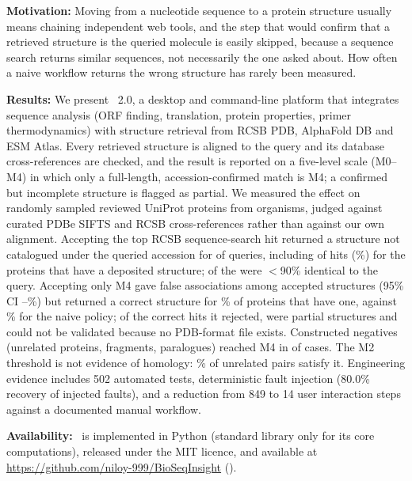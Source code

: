 \textbf{Motivation:} Moving from a nucleotide sequence to a protein structure
usually means chaining independent web tools, and the step that would confirm
that a retrieved structure is the queried molecule is easily skipped, because a
sequence search returns similar sequences, not necessarily the one asked about.
How often a naive workflow returns the wrong structure has rarely been measured.

\textbf{Results:} We present \bsi\ 2.0, a desktop and command-line platform that
integrates sequence analysis (ORF finding, translation, protein properties,
primer thermodynamics) with structure retrieval from RCSB PDB, AlphaFold DB and
ESM Atlas. Every retrieved structure is aligned to the query and its database
cross-references are checked, and the result is reported on a five-level scale
(M0--M4) in which only a full-length, accession-confirmed match is M4; a
confirmed but incomplete structure is flagged as partial. We measured the effect
on  randomly sampled reviewed UniProt proteins from 
organisms, judged against curated PDBe SIFTS and RCSB cross-references rather
than against our own alignment. Accepting the top RCSB sequence-search hit
returned a structure not catalogued under the queried accession for
 of  queries, including  of
 hits (\%) for the  proteins that have a
deposited structure;  of the  were
$<$90\% identical to the query. Accepting only M4 gave  false
associations among  accepted structures (95\% CI
--\%) but returned a correct structure for
\% of proteins that have one, against \% for the
naive policy; of the  correct hits it rejected, 
were partial structures and  could not be validated because no
PDB-format file exists. Constructed negatives (unrelated proteins, fragments,
paralogues) reached M4 in  of  cases. The M2
threshold is not evidence of homology: \% of unrelated pairs satisfy
it. Engineering evidence includes 502 automated tests, deterministic fault
injection (80.0\% recovery of injected faults), and a reduction from 849 to 14
user interaction steps against a documented manual workflow.

\textbf{Availability:} \bsi\ is implemented in Python (standard library only for
its core computations), released under the MIT licence, and available at
\url{https://github.com/niloy-999/BioSeqInsight}
().

